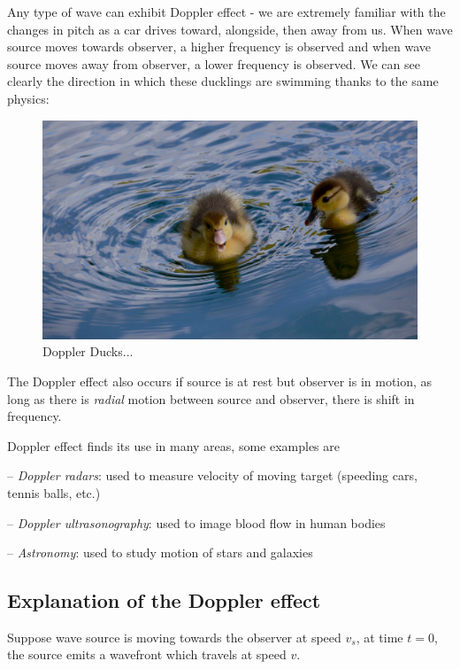 Any type of wave can exhibit Doppler effect - we are extremely familiar with the changes in pitch as a car drives toward, alongside, then away from us. When wave source moves towards observer, a higher frequency is observed and when wave source moves away from observer, a lower frequency is observed. We can see clearly the direction in which these ducklings are swimming thanks to the same physics:
\begin{figure}
    \centering
    \includegraphics[width=0.75\linewidth]{figures/Swimduck.png}
    \caption{Doppler Ducks...}
    \label{fig:enter-label}
\end{figure}

The Doppler effect also occurs if source is at rest but observer is in motion, as long as there is \emph{radial} motion between source and observer, there is shift in frequency.

Doppler effect finds its use in many areas, some examples are

\begin{compactitem}
	\item[--] \emph{Doppler radars}: used to measure velocity of moving target (speeding cars, tennis balls, etc.)
	
	\item[--] \emph{Doppler ultrasonography}: used to image blood flow in human bodies
	
	\item[--] \emph{Astronomy}: used to study motion of stars and galaxies
\end{compactitem}

\newpage

\subsection*{Explanation of the Doppler effect}

Suppose wave source is moving towards the observer at speed $v_s$, at time $t=0$, the source emits a wavefront which travels at speed $v$.

